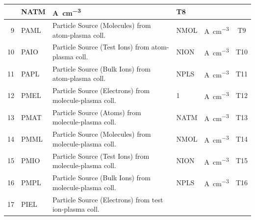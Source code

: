 \begin{landscape}
\begin{longtable}{|r|l|l|l|l|c|}
					     & NATM                             &
    \si{\ampere\per\cubic\centi\metre}       & T8
    \\ \hline
    9                                        & PAML                             &
    Particle Source (Molecules) from atom-plasma coll.
					     & NMOL                             &
    \si{\ampere\per\cubic\centi\metre}       & T9
    \\  \hline
    10                                       & PAIO                             &
    Particle Source (Test Ions) from atom-plasma coll.
					     & NION                             &
    \si{\ampere\per\cubic\centi\metre}       & T10
    \\  \hline
    11                                       & PAPL                             &
    Particle Source (Bulk Ions) from atom-plasma coll.
					     & NPLS                             &
    \si{\ampere\per\cubic\centi\metre}       & T11
    \\  \hline
    12                                       & PMEL                             &
    Particle Source (Electrons) from molecule-plasma coll.
					     & 1                                &
    \si{\ampere\per\cubic\centi\metre}       & T12
    \\  \hline
    13                                       & PMAT                             &
    Particle Source (Atoms) from molecule-plasma coll.
					     & NATM                             &
    \si{\ampere\per\cubic\centi\metre}       & T13
    \\  \hline
    14                                       & PMML                             &
    Particle Source (Molecules) from molecule-plasma coll.
					     & NMOL                             &
    \si{\ampere\per\cubic\centi\metre}       & T14
    \\  \hline
    15                                       & PMIO                             &
    Particle Source (Test Ions) from molecule-plasma coll.
					     & NION                             &
    \si{\ampere\per\cubic\centi\metre}       & T15
    \\  \hline
    16                                       & PMPL                             &
    Particle Source (Bulk Ions) from molecule-plasma coll.
					     & NPLS                             &
    \si{\ampere\per\cubic\centi\metre}       & T16
    \\	\hline
    17                                       & PIEL                             &
    Particle Source (Electrons) from test ion-plasma coll.

\end{longtable}
\end{landscape}
